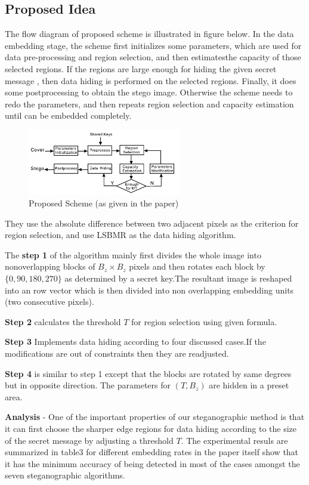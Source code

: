\documentclass{report}
\begin{document}
\subsection{Proposed Idea}
The flow diagram of  proposed scheme is illustrated in figure below. In the data embedding stage, the scheme first initializes some parameters, which are used for  data pre-processing and region selection, and then estimatesthe capacity of those selected regions. If the regions are large enough for hiding the given secret message , then data hiding is performed on the selected regions. Finally, it does some postprocessing to obtain the stego image. Otherwise the scheme needs to redo the parameters, and then repeats region selection and capacity estimation until can be embedded completely.
\begin{figure}[H]
\centering
\includegraphics[width=0.6\textwidth]{images/proposed_scheme.png}
\caption{Proposed Scheme (as given in the paper)}
\end{figure}
They use the absolute difference between two adjacent pixels as the criterion for region selection, and use LSBMR as the data hiding algorithm.
\par The {\bf step 1} of the algorithm mainly first divides the whole image into nonoverlapping  blocks of $B_{z}\times B_{z}$ pixels and then rotates each block by $\{0,90,180,270\}$ as determined by a secret key.The resultant image is reshaped into an row vector which is then divided into non overlapping embedding units (two consecutive pixels).
\par {\bf Step 2} calculates the threshold $T$ for region selection using given formula.
\par {\bf Step 3}  Implements data hiding according to four discussed cases.If the modifications are out of constraints then they are readjusted.
\par {\bf Step 4} is similar to step 1 except that the blocks are rotated by same degrees but in opposite direction.
The parameters for $(T,B_{z})$ are hidden in a preset area.

\par {\bf Analysis} - One of the important properties of our steganographic method is that it can first choose the sharper edge regions for data hiding according to the size of the secret message by adjusting a threshold $T$.
The experimental resuls are  summarized in table3 for different embedding rates  in the paper itself show that it has the minimum accuracy of being detected in most of the cases amongst the seven steganographic algorithms.
\end{document}
